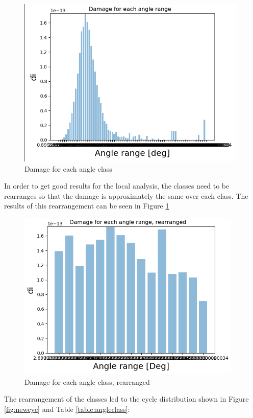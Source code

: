 \begin{figure}[H]
\centering
\includegraphics[scale=1]{figures/initialdam}
\caption[Damage for each angle class]{Damage for each angle class}
 \label{fig:initialdam}
\end{figure}
\noindent In order to get good results for the local analysis, the classes need to be rearranges so that the damage is approximately the same over each class. The results of this rearrangement can be seen in Figure \ref{fig:initialdam}

\begin{figure}[H]
\centering
\includegraphics[scale=1]{figures/newdam}
\caption[Damage for each angle class, rearranged]{Damage for each angle class, rearranged}
 \label{fig:newdam}
\end{figure}

The rearrangement of the classes led to the cycle distribution shown in Figure \ref{fig:newcyc} and Table \ref{table:angleclass}:

